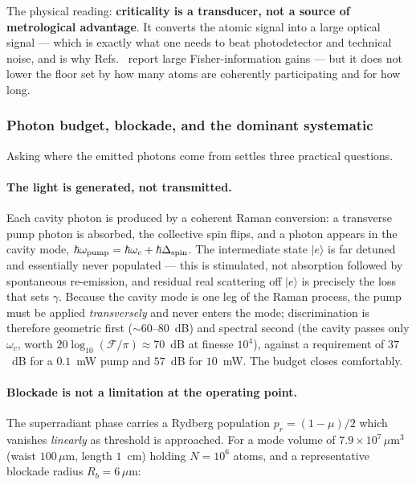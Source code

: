 \documentclass[11pt,a4paper]{article}
\newcommand{\ket}[1]{\lvert #1 \rangle}
\begin{document}
The physical reading: \textbf{criticality is a transducer, not a source of metrological
advantage}. It converts the atomic signal into a large optical signal --- which is exactly
what one needs to beat photodetector and technical noise, and is why Refs.~\cite{Ding2022,
Wang2025} report large Fisher-information gains --- but it does not lower the floor set by
how many atoms are coherently participating and for how long.

\subsubsection{Photon budget, blockade, and the dominant systematic}
\label{sec:budget}

Asking where the emitted photons come from settles three practical questions.

\paragraph{The light is generated, not transmitted.} Each cavity photon is produced by a
coherent Raman conversion: a transverse pump photon is absorbed, the collective spin flips,
and a photon appears in the cavity mode, $\hbar\omega_{\rm pump} = \hbar\omega_c +
\hbar\Delta_{\rm spin}$. The intermediate state $\ket{e}$ is far detuned and essentially
never populated --- this is stimulated, not absorption followed by spontaneous re-emission,
and residual real scattering off $\ket{e}$ is precisely the loss that sets $\gamma$. Because
the cavity mode is one leg of the Raman process, the pump must be applied \emph{transversely}
and never enters the mode; discrimination is therefore geometric first
($\sim$60--80~dB) and spectral second (the cavity passes only $\omega_c$, worth
$20\log_{10}(\mathcal{F}/\pi)\approx70$~dB at finesse $10^4$), against a requirement of
$37$~dB for a $0.1$~mW pump and $57$~dB for $10$~mW. The budget closes comfortably.

\paragraph{Blockade is not a limitation at the operating point.} The superradiant phase
carries a Rydberg population $p_r=(1-\mu)/2$ which vanishes \emph{linearly} as threshold is
approached. For a mode volume of $7.9\times10^{7}\,\mu\mathrm{m}^3$ (waist $100\,\mu$m,
length $1$~cm) holding $N=10^6$ atoms, and a representative blockade radius $R_b=6\,\mu$m:
\end{document}

